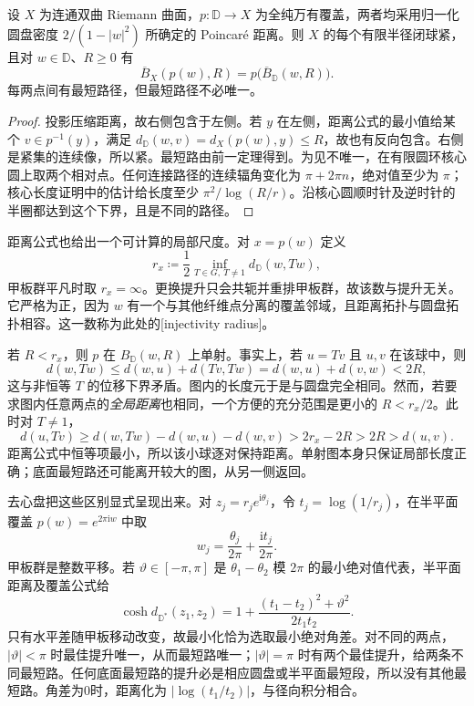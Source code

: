 \begin{proposition}[商曲面的闭球与最短路]\label{b3:prop:13-quotient-geodesics}
设 \(X\) 为连通双曲 Riemann 曲面，\(p:\mathbb D\to X\) 为全纯万有覆盖，两者均采用归一化圆盘密度 \(2/(1-|w|^2)\) 所确定的 Poincaré 距离。则 \(X\) 的每个有限半径闭球紧，且对 \(w\in\mathbb D\)、\(R\ge0\) 有
\[
 \overline B_X(p(w),R)=p\bigl(\overline B_{\mathbb D}(w,R)\bigr).
\]
每两点间有最短路径，但最短路径不必唯一。
\end{proposition}
\begin{proof}
投影压缩距离，故右侧包含于左侧。若 \(y\) 在左侧，距离公式的最小值给某个 \(v\in p^{-1}(y)\)，满足 \(d_{\mathbb D}(w,v)=d_X(p(w),y)\le R\)，故也有反向包含。右侧是紧集的连续像，所以紧。最短路由前一定理得到。为见不唯一，在有限圆环核心圆上取两个相对点。任何连接路径的连续辐角变化为 \(\pi+2\pi n\)，绝对值至少为 \(\pi\)；核心长度证明中的估计给长度至少 \(\pi^2/\log(R/r)\)。沿核心圆顺时针及逆时针的半圈都达到这个下界，且是不同的路径。
\end{proof}

\ProseParagraphBreak
距离公式也给出一个可计算的局部尺度。对 \(x=p(w)\) 定义
\[
 r_x\coloneqq\frac12\inf_{T\in G,\ T\ne1}d_{\mathbb D}(w,Tw),
\]
甲板群平凡时取 \(r_x=\infty\)。更换提升只会共轭并重排甲板群，故该数与提升无关。它严格为正，因为 \(w\) 有一个与其他纤维点分离的覆盖邻域，且距离拓扑与圆盘拓扑相容。这一数称为此处的[injectivity radius]。

\ProseParagraphBreak
若 \(R<r_x\)，则 \(p\) 在 \(B_{\mathbb D}(w,R)\) 上单射。事实上，若 \(u=Tv\) 且 \(u,v\) 在该球中，则
\[
 d(w,Tw)\le d(w,u)+d(Tv,Tw)=d(w,u)+d(v,w)<2R,
\]
这与非恒等 \(T\) 的位移下界矛盾。图内的长度元于是与圆盘完全相同。然而，若要求图内任意两点的\emph{全局距离}也相同，一个方便的充分范围是更小的 \(R<r_x/2\)。此时对 \(T\ne1\)，
\[
 d(u,Tv)\ge d(w,Tw)-d(w,u)-d(w,v)
 >2r_x-2R>2R>d(u,v).
\]
距离公式中恒等项最小，所以该小球逐对保持距离。单射图本身只保证局部长度正确；底面最短路还可能离开较大的图，从另一侧返回。

\ProseParagraphBreak
去心盘把这些区别显式呈现出来。对 \(z_j=r_je^{\mathrm i\theta_j}\)，令 \(t_j=\log(1/r_j)\)，在半平面覆盖 \(p(w)=e^{2\pi\mathrm i w}\) 中取
\[
 w_j=\frac{\theta_j}{2\pi}+\frac{\mathrm i t_j}{2\pi}.
\]
甲板群是整数平移。若 \(\vartheta\in[-\pi,\pi]\) 是 \(\theta_1-\theta_2\) 模 \(2\pi\) 的最小绝对值代表，半平面距离及覆盖公式给
\[
 \cosh d_{\mathbb D^*}(z_1,z_2)
 =1+\frac{(t_1-t_2)^2+\vartheta^2}{2t_1t_2}.
\]
只有水平差随甲板移动改变，故最小化恰为选取最小绝对角差。对不同的两点，\(|\vartheta|<\pi\) 时最佳提升唯一，从而最短路唯一；\(|\vartheta|=\pi\) 时有两个最佳提升，给两条不同最短路。任何底面最短路的提升必是相应圆盘或半平面最短段，所以没有其他最短路。角差为0时，距离化为 \(|\log(t_1/t_2)|\)，与径向积分相合。

